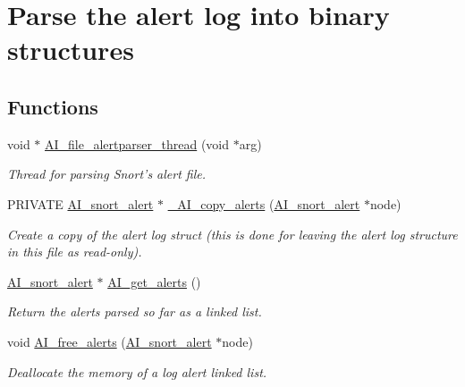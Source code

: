 \hypertarget{group__alert__parser}{
\section{Parse the alert log into binary structures}
\label{group__alert__parser}
}
\subsection*{Functions}
\begin{DoxyCompactItemize}
\item 
void $\ast$ \hyperlink{group__alert__parser_ga5aab8d9bdf0e92a51731442fd787f61f}{AI\_\-file\_\-alertparser\_\-thread} (void $\ast$arg)
\begin{DoxyCompactList}\small\item\em Thread for parsing Snort's alert file. \item\end{DoxyCompactList}\item 
PRIVATE \hyperlink{struct__AI__snort__alert}{AI\_\-snort\_\-alert} $\ast$ \hyperlink{group__alert__parser_ga6c5014cae9155379fdc4db649b2c862d}{\_\-AI\_\-copy\_\-alerts} (\hyperlink{struct__AI__snort__alert}{AI\_\-snort\_\-alert} $\ast$node)
\begin{DoxyCompactList}\small\item\em Create a copy of the alert log struct (this is done for leaving the alert log structure in this file as read-\/only). \item\end{DoxyCompactList}\item 
\hyperlink{struct__AI__snort__alert}{AI\_\-snort\_\-alert} $\ast$ \hyperlink{group__alert__parser_ga99474495643197b3075ac22ec6f6c70f}{AI\_\-get\_\-alerts} ()
\begin{DoxyCompactList}\small\item\em Return the alerts parsed so far as a linked list. \item\end{DoxyCompactList}\item 
void \hyperlink{group__alert__parser_ga270e86669a0aa64a8da37bc16cda645b}{AI\_\-free\_\-alerts} (\hyperlink{struct__AI__snort__alert}{AI\_\-snort\_\-alert} $\ast$node)
\begin{DoxyCompactList}\small\item\em Deallocate the memory of a log alert linked list. \item\end{DoxyCompactList}\end{DoxyCompactItemize}


